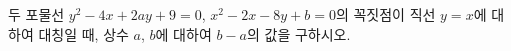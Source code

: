 두 포물선 $y^2-4x+2ay+9=0$, $x^2-2x-8y+b=0$의 꼭짓점이 직선 $y=x$에 대하여 대칭일 때, 상수 $a$, $b$에 대하여 $b-a$의 값을 구하시오.
